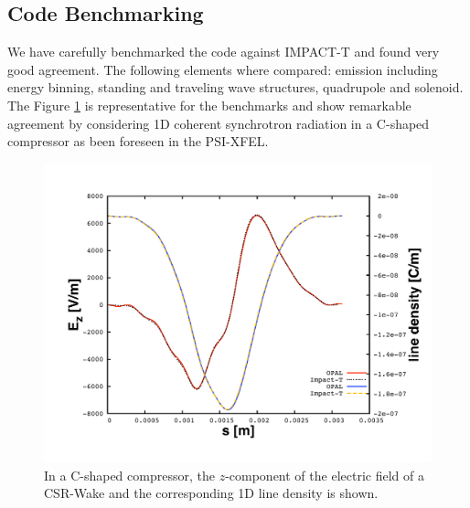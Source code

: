 \documentclass[acus]{JAC2003}
\begin{document}
\subsection{Code Benchmarking}
We have carefully benchmarked the code against IMPACT-T and found very good agreement. The following elements where compared: emission including energy binning, standing and 
traveling wave structures, quadrupole and solenoid. The Figure \ref{fig:comp} is representative for the benchmarks and show remarkable
agreement by considering 1D coherent synchrotron radiation in a C-shaped compressor as been foreseen in the PSI-XFEL.  
\begin{figure}[htb]
\begin{center}
\includegraphics[scale=0.15]{./FR5PFP065-pic1.pdf}
\vspace{-4mm}
\caption{In a C-shaped compressor, the $z$-component of the electric field of a CSR-Wake and the corresponding 1D line density is shown.}
\label{fig:comp}
\end{center}
\end{figure}
\vspace{-4mm}
\end{document}
